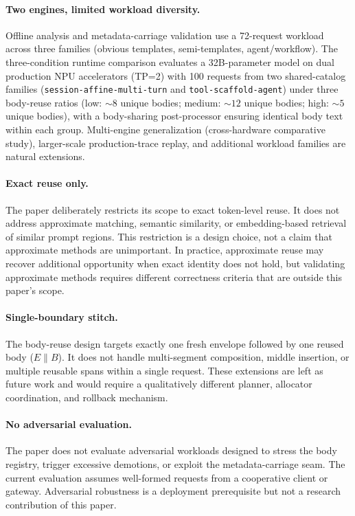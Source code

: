 \documentclass[conference]{IEEEtran}
\begin{document}
\paragraph{Two engines, limited workload diversity.}
Offline analysis and metadata-carriage validation use a 72-request workload across three families (obvious templates, semi-templates, agent/workflow). The three-condition runtime comparison evaluates a 32B-parameter model on dual production NPU accelerators (TP=2) with 100 requests from two shared-catalog families (\texttt{session-affine-multi-turn} and \texttt{tool-scaffold-agent}) under three body-reuse ratios (low: ${\sim}8$ unique bodies; medium: ${\sim}12$ unique bodies; high: ${\sim}5$ unique bodies), with a body-sharing post-processor ensuring identical body text within each group. Multi-engine generalization (cross-hardware comparative study), larger-scale production-trace replay, and additional workload families are natural extensions.

\paragraph{Exact reuse only.}
The paper deliberately restricts its scope to exact token-level reuse. It does not address approximate matching, semantic similarity, or embedding-based retrieval of similar prompt regions. This restriction is a design choice, not a claim that approximate methods are unimportant. In practice, approximate reuse may recover additional opportunity when exact identity does not hold, but validating approximate methods requires different correctness criteria that are outside this paper's scope.

\paragraph{Single-boundary stitch.}
The body-reuse design targets exactly one fresh envelope followed by one reused body ($E \| B$). It does not handle multi-segment composition, middle insertion, or multiple reusable spans within a single request. These extensions are left as future work and would require a qualitatively different planner, allocator coordination, and rollback mechanism.

\paragraph{No adversarial evaluation.}
The paper does not evaluate adversarial workloads designed to stress the body registry, trigger excessive demotions, or exploit the metadata-carriage seam. The current evaluation assumes well-formed requests from a cooperative client or gateway. Adversarial robustness is a deployment prerequisite but not a research contribution of this paper.
\end{document}
